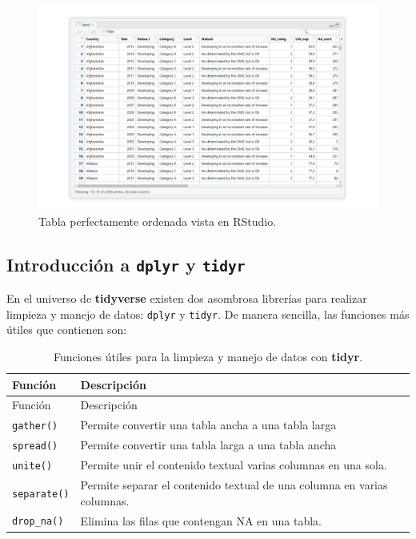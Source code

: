\documentclass[
]{article}
\theoremstyle{definition}
\theoremstyle{definition}
\theoremstyle{definition}
\theoremstyle{definition}
\theoremstyle{remark}
\begin{document}
\begin{figure}

{\centering \includegraphics[width=1\linewidth]{figs/screenshots/excel6} 

}

\caption{Tabla perfectamente ordenada vista en RStudio.}\label{fig:figura57}
\end{figure}

\hypertarget{introducciuxf3n-a-dplyr-y-tidyr}{%
\subsection{\texorpdfstring{Introducción a \texttt{dplyr} y \texttt{tidyr}}{Introducción a dplyr y tidyr}}\label{introducciuxf3n-a-dplyr-y-tidyr}}

En el universo de \textbf{tidyverse} existen dos asombrosa librerías para realizar limpieza y manejo de datos: \texttt{dplyr} y \texttt{tidyr}. De manera sencilla, las funciones más útiles que contienen son:

\begin{longtable}[]{@{}ll@{}}
\caption{\label{tab:unnamed-chunk-6}Funciones útiles para la limpieza y manejo de datos con \textbf{tidyr}.}\tabularnewline
\toprule()
Función & Descripción \\
\midrule()
\endfirsthead
\toprule()
Función & Descripción \\
\midrule()
\endhead
\texttt{gather()} & Permite convertir una tabla ancha a una tabla larga \\
\texttt{spread()} & Permite convertir una tabla larga a una tabla ancha \\
\texttt{unite()} & Permite unir el contenido textual varias columnas en una sola. \\
\texttt{separate()} & Permite separar el contenido textual de una columna en varias columnas. \\
\texttt{drop\_na()} & Elimina las filas que contengan NA en una tabla. \\
\bottomrule()
\end{longtable}
\end{document}
